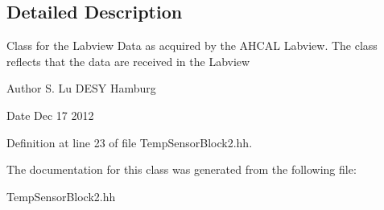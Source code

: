 \subsection{Detailed Description}
Class for the Labview Data as acquired by the AHCAL Labview. The class reflects that the data are received in the Labview \begin{DoxyAuthor}{Author}
S. Lu DESY Hamburg 
\end{DoxyAuthor}
\begin{DoxyDate}{Date}
Dec 17 2012 
\end{DoxyDate}


Definition at line 23 of file TempSensorBlock2.hh.

The documentation for this class was generated from the following file:\begin{DoxyCompactItemize}
\item 
TempSensorBlock2.hh\end{DoxyCompactItemize}
